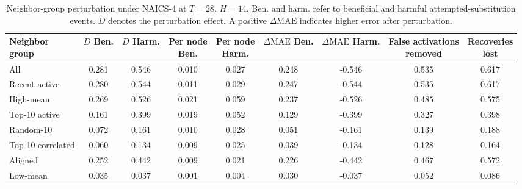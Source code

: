 \documentclass[preprint,authoryear,11pt]{elsarticle}
\theoremstyle{definition}
\begin{document}
\begin{table}[!t]
\centering
\fontsize{9pt}{11pt}\selectfont
\captionsetup{skip=3pt}
\caption{Neighbor-group perturbation under NAICS-4 at \(T=28\), \(H=14\). Ben. and harm. refer to beneficial and harmful attempted-substitution events. \(D\) denotes the perturbation effect. A positive \(\Delta\mathrm{MAE}\) indicates higher error after perturbation.}
\label{tab:metric_targeted_perturbation_naics4}
\begingroup
\setlength{\tabcolsep}{2.5pt}
\renewcommand{\arraystretch}{0.95}
\begin{adjustbox}{max width=\linewidth}
\begin{tabular*}{\linewidth}{@{\extracolsep{\fill}}lcccccccc@{}}
\toprule
\makecell[c]{Neighbor\\group}
& \makecell[c]{\(D\)\\Ben.}
& \makecell[c]{\(D\)\\Harm.}
& \makecell[c]{Per node\\Ben.}
& \makecell[c]{Per node\\Harm.}
& \makecell[c]{\(\Delta\mathrm{MAE}\)\\Ben.}
& \makecell[c]{\(\Delta\mathrm{MAE}\)\\Harm.}
& \makecell[c]{False activations\\removed}
& \makecell[c]{Recoveries\\lost} \\
\midrule
All & 0.281 & 0.546 & 0.010 & 0.027 & 0.248 & -0.546 & 0.535 & 0.617 \\
Recent-active & 0.280 & 0.544 & 0.011 & 0.029 & 0.247 & -0.544 & 0.535 & 0.617 \\
High-mean & 0.269 & 0.526 & 0.021 & 0.059 & 0.237 & -0.526 & 0.485 & 0.575 \\
Top-10 active & 0.161 & 0.399 & 0.019 & 0.052 & 0.129 & -0.399 & 0.327 & 0.398 \\
Random-10 & 0.072 & 0.161 & 0.010 & 0.028 & 0.051 & -0.161 & 0.139 & 0.188 \\
Top-10 correlated & 0.060 & 0.134 & 0.009 & 0.025 & 0.039 & -0.134 & 0.128 & 0.164 \\
Aligned & 0.252 & 0.442 & 0.009 & 0.021 & 0.226 & -0.442 & 0.467 & 0.572 \\
Low-mean & 0.035 & 0.037 & 0.001 & 0.004 & 0.030 & -0.037 & 0.052 & 0.086 \\
\bottomrule
\end{tabular*}
\end{adjustbox}
\endgroup
\end{table}
\end{document}
